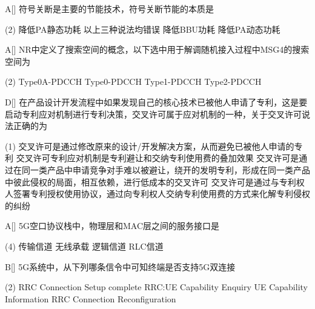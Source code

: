 \begin{choice}{A}[]
    符号关断是主要的节能技术，符号关断节能的本质是
    \begin{tasks}(2)
        \task 降低PA静态功耗
        \task 以上三种说法均错误
        \task 降低BBU功耗
        \task 降低PA动态功耗
    \end{tasks}
\end{choice}



\begin{choice}{A}[]
    NR中定义了搜索空间的概念，以下选中用于解调随机接入过程中MSG4的搜索空间为
    \begin{tasks}(2)
        \task Type0A-PDCCH
        \task Type0-PDCCH
        \task Type1-PDCCH
        \task Type2-PDCCH
    \end{tasks}
\end{choice}



\begin{choice}{D}[]
    在产品设计开发流程中如果发现自己的核心技术已被他人申请了专利，这是要启动专利应对机制进行专利决策，交叉许可属于应对机制的一种，关于交叉许可说法正确的为
    \begin{tasks}(1)
        \task  交叉许可是通过修改原来的设计/开发解决方案，从而避免已被他人申请的专利
        \task 交叉许可专利应对机制是专利避让和交纳专利使用费的叠加效果
        \task 交叉许可是通过在同一类产品中申请竞争对手难以被避让，绕开的发明专利，形成在同一类产品中彼此侵权的局面，相互依赖，进行低成本的交叉许可
        \task 交叉许可是通过与专利权人签署专利授权使用协议，通过向专利权人交纳专利使用费的方式来化解专利侵权的纠纷
    \end{tasks}
\end{choice}




\begin{choice}{A}[]
    5G空口协议栈中，物理层和MAC层之间的服务接口是
    \begin{tasks}(4)
        \task 传输信道
        \task 无线承载
        \task 逻辑信道
        \task RLC信道
    \end{tasks}
\end{choice}

\begin{choice}{B}[]
    5G系统中，从下列哪条信令中可知终端是否支持5G双连接
    \begin{tasks}(2)
        \task RRC Connection Setup complete
        \task RRC:UE Capability Enquiry
        \task UE Capability Information
        \task RRC Connection Reconfiguration
    \end{tasks}
\end{choice}

